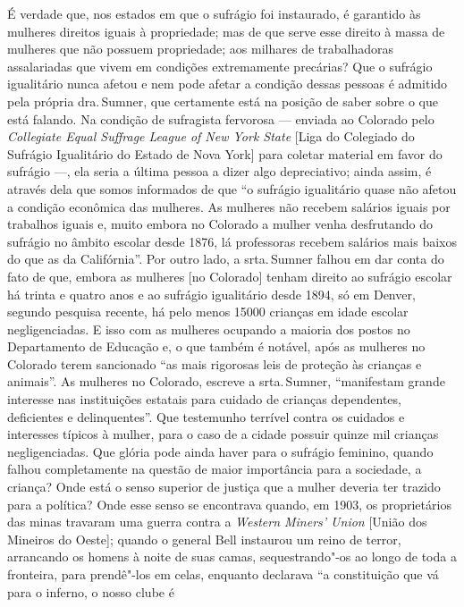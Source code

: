 É verdade que, nos estados em que o sufrágio foi instaurado, é garantido
às mulheres direitos iguais à propriedade; mas de que serve esse direito
à massa de mulheres que não possuem propriedade; aos milhares de
trabalhadoras assalariadas que vivem em condições extremamente
precárias? Que o sufrágio igualitário nunca afetou e nem pode afetar a
condição dessas pessoas é admitido pela própria dra.\,Sumner, que
certamente está na posição de saber sobre o que está falando. Na
condição de sufragista fervorosa --- enviada ao Colorado
pelo \emph{Collegiate Equal Suffrage League of New York State} {[}Liga
do Colegiado do Sufrágio Igualitário do Estado de Nova York{]} para
coletar material em favor do sufrágio ---, ela seria a última pessoa a dizer
algo depreciativo; ainda assim, é através dela que somos informados
de que ``o sufrágio igualitário quase não afetou a condição econômica
das mulheres. As mulheres não recebem salários iguais por trabalhos
iguais e, muito embora no Colorado a mulher venha desfrutando do
sufrágio no âmbito escolar desde 1876, lá professoras recebem salários
mais baixos do que as da Califórnia''. Por outro lado, a srta.\,Sumner falhou em dar conta do fato de que, embora as mulheres [no Colorado] tenham direito ao sufrágio escolar há trinta e quatro anos e ao sufrágio igualitário desde 1894, só em Denver, segundo pesquisa recente, há pelo menos 15000 crianças em idade escolar negligenciadas. E isso com as mulheres ocupando a maioria dos postos no Departamento de Educação e,
o que também é notável, após as mulheres no Colorado terem sancionado
``as mais rigorosas leis de proteção às crianças e animais''. As
mulheres no Colorado, escreve a srta.\,Sumner, ``manifestam grande
interesse nas instituições estatais para cuidado de crianças
dependentes, deficientes e delinquentes''. Que testemunho terrível
contra os cuidados e interesses típicos à mulher, para o caso de a cidade possuir
quinze mil crianças negligenciadas. Que glória pode ainda haver para o sufrágio
feminino, quando falhou completamente na questão de maior importância para a sociedade,
a criança? Onde está o senso superior de justiça que a mulher deveria
ter trazido para a política? Onde esse senso se encontrava quando, em
1903, os proprietários das minas travaram uma guerra contra a \emph{Western Miners' Union} {[}União dos Mineiros do Oeste{]}; quando o general
Bell instaurou um reino de terror, arrancando os homens à noite de suas
camas, sequestrando"-os ao longo de toda a fronteira, para prendê"-los em
celas, enquanto declarava ``a constituição que vá para o inferno, o nosso clube é
